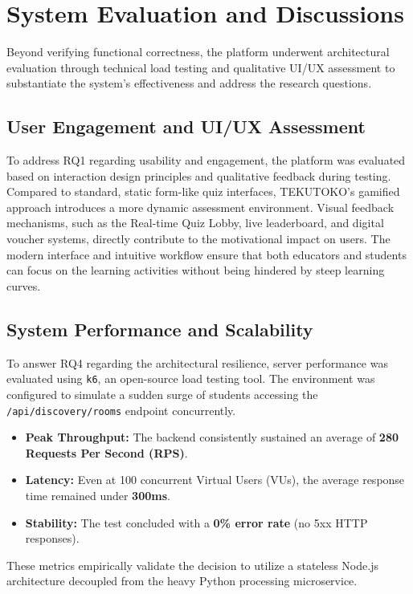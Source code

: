 \section{System Evaluation and Discussions}
\label{sec:empirical-eval}

Beyond verifying functional correctness, the platform underwent architectural evaluation through technical load testing and qualitative UI/UX assessment to substantiate the system's effectiveness and address the research questions.

\subsection{User Engagement and UI/UX Assessment}
To address RQ1 regarding usability and engagement, the platform was evaluated based on interaction design principles and qualitative feedback during testing. Compared to standard, static form-like quiz interfaces, TEKUTOKO's gamified approach introduces a more dynamic assessment environment. Visual feedback mechanisms, such as the Real-time Quiz Lobby, live leaderboard, and digital voucher systems, directly contribute to the motivational impact on users. The modern interface and intuitive workflow ensure that both educators and students can focus on the learning activities without being hindered by steep learning curves.

\subsection{System Performance and Scalability}
To answer RQ4 regarding the architectural resilience, server performance was evaluated using \texttt{k6}, an open-source load testing tool. The environment was configured to simulate a sudden surge of students accessing the \texttt{/api/discovery/rooms} endpoint concurrently.
\begin{itemize}
    \item \textbf{Peak Throughput:} The backend consistently sustained an average of \textbf{280 Requests Per Second (RPS)}.
    \item \textbf{Latency:} Even at 100 concurrent Virtual Users (VUs), the average response time remained under \textbf{300ms}.
    \item \textbf{Stability:} The test concluded with a \textbf{0\% error rate} (no 5xx HTTP responses).
\end{itemize}
These metrics empirically validate the decision to utilize a stateless Node.js architecture decoupled from the heavy Python processing microservice.

